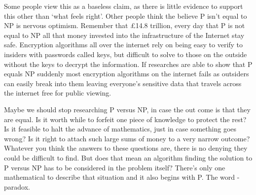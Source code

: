\documentclass[twoside,10pt]{article}
\begin{document}
Some people view this as a baseless claim, as there is little evidence to support this other than `what feels right'. Other people think the believe P isn't equal to NP is nervous optimism. Remember that £14.8 trillion, every day that P is not equal to NP all that money invested into the infrastructure of the Internet stay safe. Encryption algorithms all over the internet rely on being easy to verify to insiders with passwords called keys, but difficult to solve to those on the outside without the keys to decrypt the information. If researches are able to show that P equals NP suddenly most encryption algorithms on the internet fails as outsiders can easily break into them leaving everyone's sensitive data that travels across the internet free for public viewing.

Maybe we should stop researching P versus NP, in case the out come is that they are equal. Is it worth while to forfeit one piece of knowledge to protect the rest? Is it feasible to halt the advance of mathematics, just in case something goes wrong? Is it right to attach such large sums of money to a very narrow outcome? Whatever you think the answers to these questions are, there is no denying they could be difficult to find. But does that mean an algorithm finding the solution to P versus NP has to be considered in the problem itself? There's only one mathematical to describe that situation and it also begins with P. The word - paradox.

\printbibliography
\end{document}
